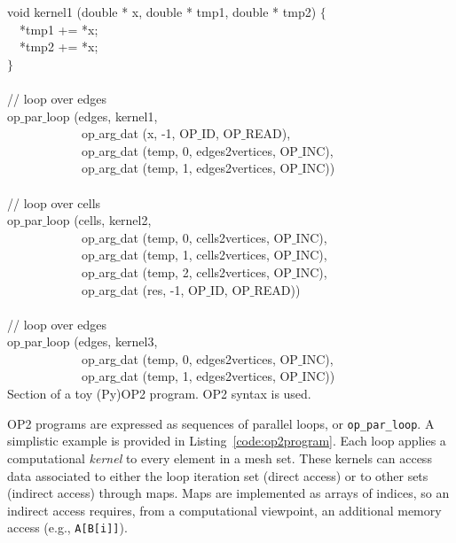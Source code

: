 \begin{algorithm}[t]
\scriptsize\ttfamily
{}

void kernel1 (double * x, double * tmp1, double * tmp2) $\lbrace$\\
~~*tmp1 += *x;\\
~~*tmp2 += *x;\\
$\rbrace$~\\
~\\
// loop over edges\\
op$\_$par$\_$loop (edges, kernel1,\\
~~~~~~~~~~~~op$\_$arg$\_$dat (x, -1, OP$\_$ID, OP$\_$READ),\\
~~~~~~~~~~~~op$\_$arg$\_$dat (temp, 0, edges2vertices, OP$\_$INC),\\
~~~~~~~~~~~~op$\_$arg$\_$dat (temp, 1, edges2vertices, OP$\_$INC))\\
~\\
// loop over cells\\
op$\_$par$\_$loop (cells, kernel2,\\
~~~~~~~~~~~~op$\_$arg$\_$dat (temp, 0, cells2vertices, OP$\_$INC),\\
~~~~~~~~~~~~op$\_$arg$\_$dat (temp, 1, cells2vertices, OP$\_$INC),\\
~~~~~~~~~~~~op$\_$arg$\_$dat (temp, 2, cells2vertices, OP$\_$INC),\\
~~~~~~~~~~~~op$\_$arg$\_$dat (res, -1, OP$\_$ID, OP$\_$READ))\\
~\\
// loop over edges\\
op$\_$par$\_$loop (edges, kernel3,\\
~~~~~~~~~~~~op$\_$arg$\_$dat (temp, 0, edges2vertices, OP$\_$INC),\\
~~~~~~~~~~~~op$\_$arg$\_$dat (temp, 1, edges2vertices, OP$\_$INC))\\

\caption{Section of a toy (Py)OP2 program. OP2 syntax is used.}
\label{code:op2program}
\end{algorithm}

OP2 programs are expressed as sequences of parallel loops, or {\tt op\_par\_loop}. A simplistic example is provided in Listing~\ref{code:op2program}. Each loop applies a computational {\em kernel} to every element in a mesh set. These kernels can access data associated to either the loop iteration set (direct access) or to other sets (indirect access) through maps. Maps are implemented as arrays of indices, so an indirect access requires, from a computational viewpoint, an additional memory access (e.g., \texttt{A[B[i]]}).


